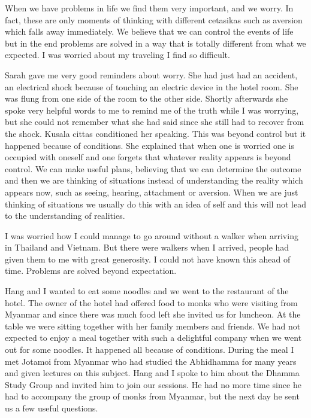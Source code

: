 When we have problems in life we find them very important,
and we worry. In fact, these are only moments of thinking with different
cetasikas such as aversion which falls away immediately. We believe that
we can control the events of life but in the end problems are solved in
a way that is totally different from what we expected. I was worried
about my traveling I find so difficult. 

Sarah gave me very good reminders about worry. She had just
had an accident, an electrical shock because of touching an electric
device in the hotel room. She was flung from one side of the room to the
other side. Shortly afterwards she spoke very helpful words to me to
remind me of the truth while I was worrying, but she could not remember
what she had said since she still had to recover from the shock. Kusala
cittas conditioned her speaking. This was beyond control but it happened
because of conditions. She explained that when one is worried one is
occupied with oneself and one forgets that whatever reality appears is
beyond control. We can make useful plans, believing that we can
determine the outcome and then we are thinking of situations instead of
understanding the reality which appears now, such as seeing, hearing,
attachment or aversion. When we are just thinking of situations we
usually do this with an idea of self and this will not lead to the
understanding of realities. 

I was worried how I could manage to go around without a
walker when arriving in Thailand and Vietnam. But there were walkers
when I arrived, people had given them to me with great generosity. I
could not have known this ahead of time. Problems are solved beyond
expectation. 

Hang and I wanted to eat some noodles and we went to the
restaurant of the hotel. The owner of the hotel had offered food to
monks who were visiting from Myanmar and since there was much food left
she invited us for 
luncheon. At the table we were sitting together with her
family members and friends. We had not expected to enjoy a meal together
with such a delightful company when we
went out for some noodles. It happened all because of
conditions. During the meal I met Jotamoi from Myanmar who had studied
the Abhidhamma for many years and given lectures on this subject. Hang
and I spoke to him about the Dhamma Study Group and invited him to join
our sessions. He had no more time since he had to accompany the group of
monks from Myanmar, but the next day he sent us a few useful questions.


